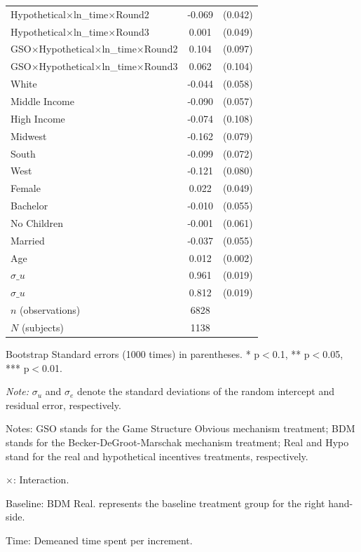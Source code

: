 \documentclass[12pt]{article}
\newcommand{\sym}[1]{\rlap{$^{#1}$}}
\begin{document}
\begin{table}[H]
{\begin{tabular}{l*{1}{cc}}
Hypothetical$\times$ln\_time$\times$Round2&      -0.069\sym{*}  &     (0.042)\\
Hypothetical$\times$ln\_time$\times$Round3&       0.001         &     (0.049)\\
GSO$\times$Hypothetical$\times$ln\_time$\times$Round2&       0.104         &     (0.097)\\
GSO$\times$Hypothetical$\times$ln\_time$\times$Round3&       0.062         &     (0.104)\\
White       &      -0.044         &     (0.058)\\
Middle Income&      -0.090         &     (0.057)\\
High Income &      -0.074         &     (0.108)\\
Midwest     &      -0.162\sym{**} &     (0.079)\\
South       &      -0.099         &     (0.072)\\
West        &      -0.121         &     (0.080)\\
Female      &       0.022         &     (0.049)\\
Bachelor    &      -0.010         &     (0.055)\\
No Children &      -0.001         &     (0.061)\\
Married     &      -0.037         &     (0.055)\\
Age         &       0.012\sym{***}&     (0.002)\\
$\sigma\_u $    &       0.961\sym{***}&     (0.019)\\
$\sigma\_u $     &       0.812\sym{***}&     (0.019)\\
\hline

\(n\) (observations)      &        6828         &            \\
\(N\) (subjects)       &        1138         &            \\
\hline \hline
\end{tabular}
}

\begin{tablenotes}
            \footnotesize
            \item Bootstrap Standard errors (1000 times) in parentheses. * p$<$0.1, ** p$<$0.05, *** p$<$0.01.
            \item \textit{Note:} $\sigma_u$ and $\sigma_e$ denote the standard deviations of the random intercept and residual error, respectively.
            \item Notes: GSO stands for the Game Structure Obvious mechanism treatment; BDM stands for the Becker-DeGroot-Marschak mechanism treatment; Real and Hypo stand for the real and hypothetical incentives treatments, respectively.
           \item $\times$: Interaction.
           \item Baseline: BDM Real. represents the baseline treatment group for the right hand-side.
           \item Time: Demeaned time spent per increment.
        \end{tablenotes}
\end{table}
\end{document}

